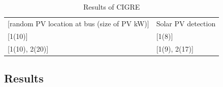 \begin{table}[h]
  \caption{Results of CIGRE}
  \begin{tabular}{ll}
  {[}random PV location at bus (size of PV kW){]} & Solar PV detection \\
  {[}1(10){]}                                     & {[}1(8){]}         \\
  {[}1(10), 2(20){]}                              & {[}1(9), 2(17){]}
  \end{tabular}
  \label{tab.res_2}
\end{table}



\subsection{Results}
